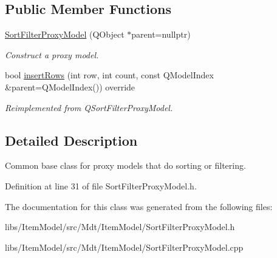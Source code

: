 \subsection*{Public Member Functions}
\begin{DoxyCompactItemize}
\item 
\hyperlink{class_mdt_1_1_item_model_1_1_sort_filter_proxy_model_a316694786f53833c20c46750391db383}{Sort\+Filter\+Proxy\+Model} (Q\+Object $\ast$parent=nullptr)\hypertarget{class_mdt_1_1_item_model_1_1_sort_filter_proxy_model_a316694786f53833c20c46750391db383}{}\label{class_mdt_1_1_item_model_1_1_sort_filter_proxy_model_a316694786f53833c20c46750391db383}

\begin{DoxyCompactList}\small\item\em Construct a proxy model. \end{DoxyCompactList}\item 
bool \hyperlink{class_mdt_1_1_item_model_1_1_sort_filter_proxy_model_a2d9d05cbe33512327a492b3664e2aded}{insert\+Rows} (int row, int count, const Q\+Model\+Index \&parent=Q\+Model\+Index()) override\hypertarget{class_mdt_1_1_item_model_1_1_sort_filter_proxy_model_a2d9d05cbe33512327a492b3664e2aded}{}\label{class_mdt_1_1_item_model_1_1_sort_filter_proxy_model_a2d9d05cbe33512327a492b3664e2aded}

\begin{DoxyCompactList}\small\item\em Reimplemented from Q\+Sort\+Filter\+Proxy\+Model. \end{DoxyCompactList}\end{DoxyCompactItemize}


\subsection{Detailed Description}
Common base class for proxy models that do sorting or filtering. 

Definition at line 31 of file Sort\+Filter\+Proxy\+Model.\+h.



The documentation for this class was generated from the following files\+:\begin{DoxyCompactItemize}
\item 
libs/\+Item\+Model/src/\+Mdt/\+Item\+Model/Sort\+Filter\+Proxy\+Model.\+h\item 
libs/\+Item\+Model/src/\+Mdt/\+Item\+Model/Sort\+Filter\+Proxy\+Model.\+cpp\end{DoxyCompactItemize}

